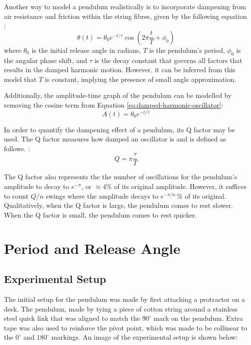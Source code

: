 \documentclass[12pt]{article}
\begin{document}
Another way to model a pendulum realistically is to incorporate dampening from air resistance and friction within the string fibres, given by the following equation \cite{damped-oscillations}:
\begin{equation} \label{eq:damped-harmonic-oscillator}
    \theta(t) = \theta_0 e^{-{t/\tau}} \cos\left(2\pi\frac{t}{T} + \phi_0\right)
\end{equation}
where $\theta_0$ is the initial release angle in radians, $T$ is the pendulum's period, $\phi_0$ is the angular phase shift, and $\tau$ {\color{blue} is the decay constant that governs all factors that results in the damped harmonic motion. However, it can be inferred from this model that $T$ is constant, implying the presence of small angle approximation.}

{\color{blue}
Additionally, the amplitude-time graph of the pendulum can be modelled by removing the cosine term from Equation \ref{eq:damped-harmonic-oscillator}:
\begin{equation} \label{eq:amplitude-function}
    A(t) = \theta_0 e^{-{t/\tau}}
\end{equation}}

In order to quantify the dampening effect of a pendulum, its Q factor may be used. The Q factor measures how damped an oscillator is and is defined as follows. \cite{pnp-physics}:
\begin{equation} \label{eq:q-factor-formula}
    Q = \pi\frac{\tau}{T}
\end{equation}

The Q factor also represents the the number of oscillations for the pendulum's amplitude to decay to $e^{-\pi}$, or $\approx 4\%$ of its original amplitude. {\color{blue}However, it suffices to count $Q/n$ swings where the amplitude decays to $e^{-\pi/n}\,\%$ of its original. Qualitatively, when the Q factor is large, the pendulum comes to rest slower. When the Q factor is small, the pendulum comes to rest quicker.}

\newpage

\section{Period and Release Angle}

\subsection{Experimental Setup}
The initial setup for the pendulum was made by first attaching a protractor on a desk. The pendulum, made by tying a piece of cotton string around a stainless steel quick link {\color{blue} that was aligned to match the $90^{\circ}$ mark on the pendulum. Extra tape was also used to reinforce the pivot point, which was made to be collinear to the $0^{\circ}$ and $180^{\circ}$ markings.} An image of the experimental setup is shown below:
\end{document}
